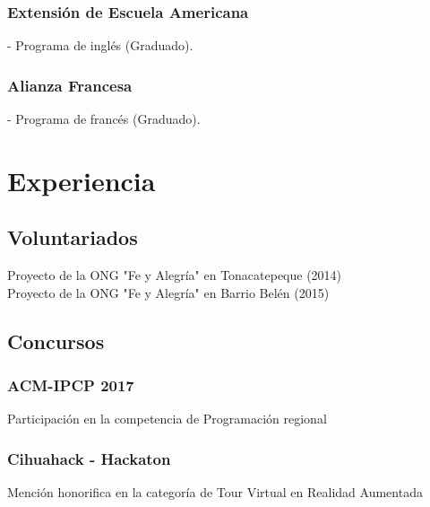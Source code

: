 \documentclass{article}
\begin{document}
    \subsubsection{Extensión de Escuela Americana} - Programa de inglés (Graduado).
    \subsubsection{Alianza Francesa} - Programa de francés (Graduado).
    \section{Experiencia}
    \subsection{Voluntariados}
    Proyecto de la ONG "Fe y Alegría" en Tonacatepeque (2014)
    \\ Proyecto de la ONG "Fe y Alegría" en Barrio Belén (2015)
    \subsection{Concursos}
    \subsubsection{ACM-IPCP 2017}
    Participación en la competencia de Programación regional
    \subsubsection{Cihuahack - Hackaton}
    Mención honorifica en la categoría de Tour Virtual en Realidad Aumentada
\end{document}
